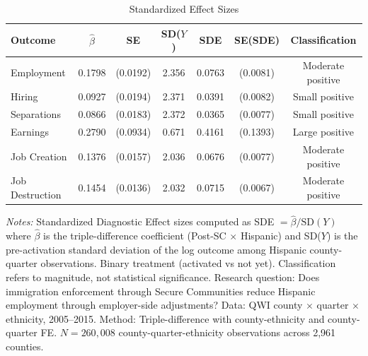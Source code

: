\begin{table}[htbp]
\centering
\caption{Standardized Effect Sizes}
\label{tab:sde}
\begin{tabular}{lcccccc}
\toprule
Outcome & $\hat{\beta}$ & SE & SD($Y$) & SDE & SE(SDE) & Classification \\
\midrule
Employment & 0.1798 & (0.0192) & 2.356 & 0.0763 & (0.0081) & Moderate positive \\
Hiring & 0.0927 & (0.0194) & 2.371 & 0.0391 & (0.0082) & Small positive \\
Separations & 0.0866 & (0.0183) & 2.372 & 0.0365 & (0.0077) & Small positive \\
Earnings & 0.2790 & (0.0934) & 0.671 & 0.4161 & (0.1393) & Large positive \\
Job Creation & 0.1376 & (0.0157) & 2.036 & 0.0676 & (0.0077) & Moderate positive \\
Job Destruction & 0.1454 & (0.0136) & 2.032 & 0.0715 & (0.0067) & Moderate positive \\
\bottomrule
\end{tabular}
\begin{tablenotes}[flushleft]
\small
\item \textit{Notes:} Standardized Diagnostic Effect sizes computed as SDE $= \hat{\beta}/\text{SD}(Y)$ where $\hat{\beta}$ is the triple-difference coefficient (Post-SC $\times$ Hispanic) and SD($Y$) is the pre-activation standard deviation of the log outcome among Hispanic county-quarter observations. Binary treatment (activated vs not yet). Classification refers to magnitude, not statistical significance. Research question: Does immigration enforcement through Secure Communities reduce Hispanic employment through employer-side adjustments? Data: QWI county $\times$ quarter $\times$ ethnicity, 2005--2015. Method: Triple-difference with county-ethnicity and county-quarter FE. $N = 260,008$ county-quarter-ethnicity observations across 2,961 counties.
\end{tablenotes}
\end{table}

